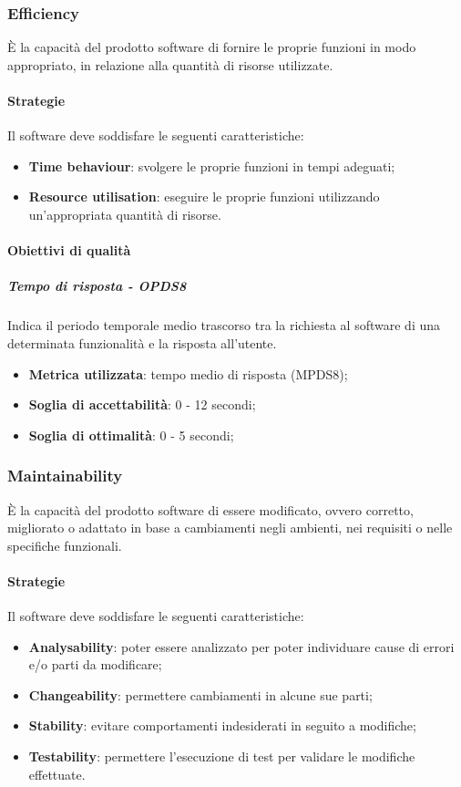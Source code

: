 \documentclass[PianoDiQualifica.tex]{subfiles}
\begin{document}
		\subsubsection{Efficiency}
		È la capacità del prodotto software di fornire le proprie funzioni in modo appropriato, in relazione alla quantità di risorse utilizzate.
		
			\paragraph{Strategie}
			Il software deve soddisfare le seguenti caratteristiche:
			\begin{itemize}
				\item \textbf{Time behaviour}: svolgere le proprie funzioni in tempi adeguati;
				\item \textbf{Resource utilisation}: eseguire le proprie funzioni utilizzando un'appropriata quantità di risorse.			
			\end{itemize}
			
			\paragraph{Obiettivi di qualità}
			
				\subparagraph{Tempo di risposta - OPDS8}
				Indica il periodo temporale medio trascorso tra la richiesta al software di una determinata funzionalità e la risposta all'utente.
				\begin{itemize}
					\item \textbf{Metrica utilizzata}: tempo medio di risposta (MPDS8);
					\item \textbf{Soglia di accettabilità}: 0 - 12 secondi;
					\item \textbf{Soglia di ottimalità}: 0 - 5 secondi;
				\end{itemize}
		
		\subsubsection{Maintainability}
		È la capacità del prodotto software di essere modificato, ovvero corretto, migliorato o adattato in base a cambiamenti negli ambienti, nei requisiti o
		nelle specifiche funzionali.
		
			\paragraph{Strategie}
			Il software deve soddisfare le seguenti caratteristiche:
			\begin{itemize}
				\item \textbf{Analysability}: poter essere analizzato per poter individuare cause di errori e/o parti da modificare;
				\item \textbf{Changeability}: permettere cambiamenti in alcune sue parti;
				\item \textbf{Stability}: evitare comportamenti indesiderati in seguito a modifiche;
				\item \textbf{Testability}: permettere l'esecuzione di test per validare le modifiche effettuate.
			\end{itemize}
			
\end{document}
